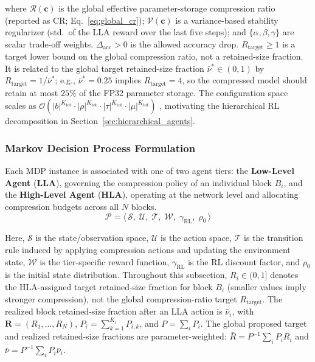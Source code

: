 \documentclass[preprint,12pt,authoryear]{elsarticle}
\begin{document}
\noindent where $\mathcal{R}(\mathbf{c})$ is the global effective parameter-storage
compression ratio (reported as CR; Eq.~\eqref{eq:global_cr}); $\mathcal{V}(\mathbf{c})$
is a variance-based stability regularizer (std.\ of the LLA reward over the last five
steps); and $\{\alpha,\beta,\gamma\}$ are scalar trade-off weights.
$\Delta_{\mathrm{acc}} > 0$ is the allowed accuracy drop. $R_{\mathrm{target}} \geq 1$
is a target lower bound on the global compression ratio, not a retained-size fraction.
It is related to the global target retained-size fraction $\bar{\nu}^* \in (0,1)$ by
$R_{\mathrm{target}} = 1/\bar{\nu}^*$; e.g., $\bar{\nu}^* = 0.25$ implies
$R_{\mathrm{target}} = 4$, so the compressed model should retain at most $25\%$ of the
FP32 parameter storage. The configuration space scales as
$\mathcal{O}(|b|^{K_{\mathrm{tot}}} \cdot |\rho|^{K_{\mathrm{tot}}}
\cdot |\tau|^{K_{\mathrm{tot}}} \cdot |\mu|^{K_{\mathrm{tot}}})$
\cite{han2016deepcompression, he2018amc, wang2019haq},
motivating the hierarchical RL decomposition in Section~\ref{sec:hierarchical_agents}.


\subsubsection{Markov Decision Process Formulation}
\label{sec:mdp}

Each MDP instance is associated with one of two agent tiers: the \textbf{Low-Level
Agent} (\textbf{LLA}), governing the compression policy of an individual block $B_i$,
and the \textbf{High-Level Agent} (\textbf{HLA}), operating at the network level and
allocating compression budgets across all $N$ blocks.
\begin{equation}
    \mathcal{P} = \langle\, \mathcal{S},\; \mathcal{U},\; \mathcal{T},\;
                             \mathcal{W},\; \gamma_{\mathrm{RL}},\; \rho_0 \,\rangle
    \label{eq:mdp_tuple}
\end{equation}

\noindent Here, $\mathcal{S}$ is the state/observation space, $\mathcal{U}$ is the
action space, $\mathcal{T}$ is the transition rule induced by applying compression
actions and updating the environment state, $\mathcal{W}$ is the tier-specific reward
function, $\gamma_{\mathrm{RL}}$ is the RL discount factor, and $\rho_0$ is the initial
state distribution. Throughout this subsection, $R_i \in (0,1]$ denotes the
HLA-assigned target retained-size fraction for block $B_i$ (smaller values imply stronger
compression), not the global compression-ratio target $R_{\mathrm{target}}$. The
realized block retained-size fraction after an LLA action is $\bar{\nu}_i$, with
$\mathbf{R}=(R_1,\ldots,R_N)$, $P_i=\sum_{k=1}^{K_i}P_{i,k}$, and $P=\sum_i P_i$.
The global proposed target and realized retained-size fractions are parameter-weighted:
$\bar{R}=P^{-1}\sum_i P_iR_i$ and $\bar{\nu}=P^{-1}\sum_i P_i\bar{\nu}_i$.
\end{document}
